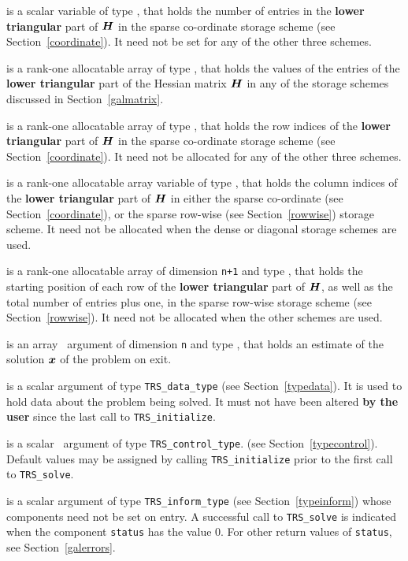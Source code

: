 \documentclass{galahad}
\newcommand{\packagename}{TRS}
\begin{document}
\begin{description}
\begin{description}
 is a scalar variable of type \integer, that
holds the number of entries in the {\bf lower triangular} part of ${\bm{H}}$
in the sparse co-ordinate storage scheme (see Section~\ref{coordinate}).
It need not be set for any of the other three schemes.

 is a rank-one allocatable array of type \realdp, that holds
the values of the entries of the {\bf lower triangular} part
of the Hessian matrix ${\bm{H}}$ in any of the
storage schemes discussed in Section~\ref{galmatrix}.

 is a rank-one allocatable array of type \integer,
that holds the row indices of the {\bf lower triangular} part of ${\bm{H}}$
in the sparse co-ordinate storage
scheme (see Section~\ref{coordinate}).
It need not be allocated for any of the other three schemes.

 is a rank-one allocatable array variable of type \integer,
that holds the column indices of the {\bf lower triangular} part of
${\bm{H}}$ in either the sparse co-ordinate
(see Section~\ref{coordinate}), or the sparse row-wise
(see Section~\ref{rowwise}) storage scheme.
It need not be allocated when the dense or diagonal storage schemes are used.

 is a rank-one allocatable array of dimension {\tt n+1} and type
\integer, that holds the starting position of
each row of the {\bf lower triangular} part of ${\bm{H}}$, as well
as the total number of entries plus one, in the sparse row-wise storage
scheme (see Section~\ref{rowwise}). It need not be allocated when the
other schemes are used.

\end{description}

 is an array \intentout\ argument of dimension {\tt n} and
type \realdp, that holds an estimate of the solution ${\bm{x}}$
of the problem on exit.

 is a scalar \intentinout argument of type
{\tt \packagename\_data\_type}
(see Section~\ref{typedata}). It is used to hold data about the problem being
solved. It must not have been altered {\bf by the user} since the last call to
{\tt \packagename\_initialize}.

 is a scalar \intentin\ argument of type
{\tt \packagename\_control\_type}.
(see Section~\ref{typecontrol}).
Default values may be assigned by calling {\tt \packagename\_initialize}
prior to the first call to {\tt \packagename\_solve}.

 is a scalar \intentinout argument of type
{\tt \packagename\_inform\_type}
(see Section~\ref{typeinform})
whose components need not be set on entry.
A successful call to
{\tt \packagename\_solve}
is indicated when the  component {\tt status} has the value 0.
For other return values of {\tt status}, see Section~\ref{galerrors}.


\end{description}
\end{document}
